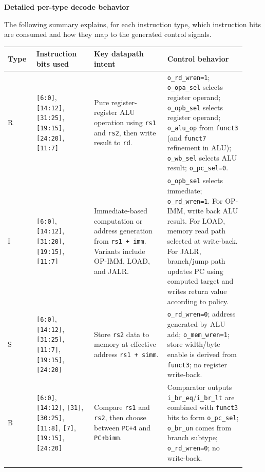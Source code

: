 \documentclass[10pt,a4paper]{article}
\begin{document}
\textbf{Detailed per-type decode behavior}

The following summary explains, for each instruction type, which instruction
bits are consumed and how they map to the generated control signals.

\begin{center}
\small
\begin{tabular}{@{}p{0.11\linewidth}p{0.22\linewidth}p{0.29\linewidth}p{0.30\linewidth}@{}}
\toprule
\textbf{Type} & \textbf{Instruction bits used} & \textbf{Key datapath intent} & \textbf{Control behavior} \\
\midrule
R & \texttt{[6:0]}, \texttt{[14:12]}, \texttt{[31:25]}, \texttt{[19:15]}, \texttt{[24:20]}, \texttt{[11:7]} &
Pure register-register ALU operation using \texttt{rs1} and \texttt{rs2}, then write result to \texttt{rd}. &
\texttt{o\_rd\_wren=1}; \texttt{o\_opa\_sel} selects register operand; \texttt{o\_opb\_sel} selects register operand; \texttt{o\_alu\_op} from \texttt{funct3} (and \texttt{funct7} refinement in ALU); \texttt{o\_wb\_sel} selects ALU result; \texttt{o\_pc\_sel=0}. \\
\addlinespace
I & \texttt{[6:0]}, \texttt{[14:12]}, \texttt{[31:20]}, \texttt{[19:15]}, \texttt{[11:7]} &
Immediate-based computation or address generation from \texttt{rs1 + imm}. Variants include OP-IMM, LOAD, and JALR. &
\texttt{o\_opb\_sel} selects immediate; \texttt{o\_rd\_wren=1}. For OP-IMM, write back ALU result. For LOAD, memory read path selected at write-back. For JALR, branch/jump path updates PC using computed target and writes return value according to policy. \\
\addlinespace
S & \texttt{[6:0]}, \texttt{[14:12]}, \texttt{[31:25]}, \texttt{[11:7]}, \texttt{[19:15]}, \texttt{[24:20]} &
Store \texttt{rs2} data to memory at effective address \texttt{rs1 + simm}. &
\texttt{o\_rd\_wren=0}; address generated by ALU add; \texttt{o\_mem\_wren=1}; store width/byte enable is derived from \texttt{funct3}; no register write-back. \\
\addlinespace
B & \texttt{[6:0]}, \texttt{[14:12]}, \texttt{[31]}, \texttt{[30:25]}, \texttt{[11:8]}, \texttt{[7]}, \texttt{[19:15]}, \texttt{[24:20]} &
Compare \texttt{rs1} and \texttt{rs2}, then choose between \texttt{PC+4} and \texttt{PC+bimm}. &
Comparator outputs \texttt{i\_br\_eq}/\texttt{i\_br\_lt} are combined with \texttt{funct3} bits to form \texttt{o\_pc\_sel}; \texttt{o\_br\_un} comes from branch subtype; \texttt{o\_rd\_wren=0}; no write-back. \\
\addlinespace

\end{tabular}
\end{center}
\end{document}
